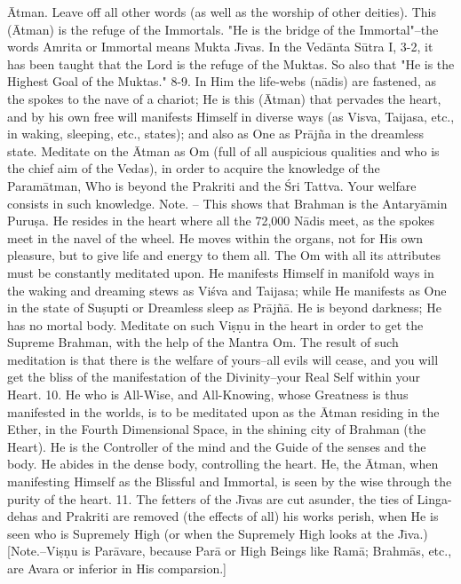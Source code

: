 \=Atman. Leave off all other words (as well as the worship of other deities). This (\=Atman) is the refuge of the Immortals.
"He is the bridge of the Immortal"--the words Amrita or Immortal means Mukta J\={\i}vas. In the Ved\=anta S\=utra I, 3-2, it has been taught that the Lord is the refuge of the Muktas. So also that "He is the Highest Goal of the Muktas."
8-9. In Him the life-webs (n\=adis) are fastened, as the spokes to the nave of a chariot; He is this (\=Atman) that pervades the heart, and by his own free will manifests Himself in diverse ways (as Visva, Taijasa, etc., in waking, sleeping, etc., states); and also as One as Pr\=aj\~na in the dreamless state. Meditate on the \=Atman as Om (full of all auspicious qualities and who is the chief aim of the Vedas), in order to acquire the knowledge of the Param\=atman, Who is beyond the Prakriti and the \'Sri Tattva. Your welfare consists in such knowledge.
Note. -- This shows that Brahman is the Antary\=amin Puru\d{s}a. He resides in the heart where all the 72,000 N\=adis meet, as the spokes meet in the navel of the wheel. He moves within the organs, not for His own pleasure, but to give life and energy to them all. The Om with all its attributes must be constantly meditated upon. He manifests Himself in manifold ways in the waking and dreaming stews as Vi\'sva and Taijasa; while He manifests as One in the state of Su\d{s}upti or Dreamless sleep as Pr\=aj\~n\=a. He is beyond darkness; He has no mortal body. Meditate on such Vi\d{s}\d{n}u in the heart in order to get the Supreme Brahman, with the help of the Mantra Om. The result of such meditation is that there is the welfare of yours--all evils will cease, and you will get the bliss of the manifestation of the Divinity--your Real Self within your Heart.
10. He who is All-Wise, and All-Knowing, whose Greatness is thus manifested in the worlds, is to be meditated upon as the \=Atman residing in the Ether, in the Fourth Dimensional Space, in the shining city of Brahman (the Heart). He is the Controller of the mind and the Guide of the senses and the body. He abides in the dense body, controlling the heart. He, the \=Atman, when manifesting Himself as the Blissful and Immortal, is seen by the wise through the purity of the heart.
11. The fetters of the J\={\i}vas are cut asunder, the ties of Linga-dehas and Prakriti are removed (the effects of all) his works perish, when He is seen who is Supremely High (or when the Supremely High looks at the J\={\i}va.) [Note.--Vi\d{s}\d{n}u is Par\=avare, because Par\=a or High Beings like Ram\=a; Brahm\=as, etc., are Avara or inferior in His comparsion.]

